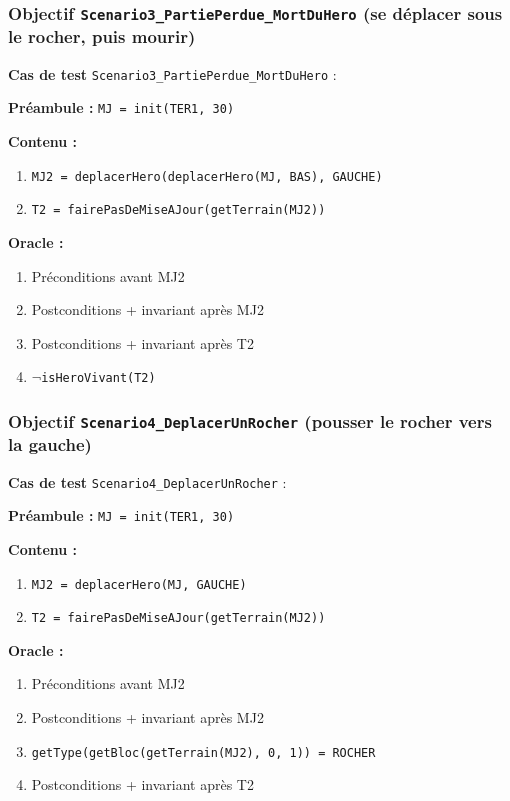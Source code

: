 \documentclass{article}
\newcommand{\cmd}[1]{\texttt{#1}}
\newcommand{\lNOT}{$\lnot$}
\newcommand{\obj}[2]{\subsubsection*{\large{\textbf{Objectif {\cmd{#1} (#2)}}}}}
\newenvironment{cas}[1]
{
	\hspace{1em}\textbf{Cas de test} \cmd{#1} :
	\begin{list}{}{}
}{
	\end{list}\vspace{1em}
}
\newcommand{\pre}[1]{\item \textbf{Préambule :} \cmd{#1}}
\newcommand{\oram}{\item \textbf{Oracle :}}
\newcommand{\opem}{\item \textbf{Contenu :}}
\begin{document}
\obj{Scenario3\_PartiePerdue\_MortDuHero} {se déplacer sous le rocher, puis mourir}
	\begin{cas} {Scenario3\_PartiePerdue\_MortDuHero}
		\pre{MJ = init(TER1, 30)}
		\opem{}
		\begin{enumerate}
			\item \cmd{MJ2 = deplacerHero(deplacerHero(MJ, BAS), GAUCHE)}
			\item \cmd{T2 = fairePasDeMiseAJour(getTerrain(MJ2))}
		\end{enumerate}
		\oram{}
		\begin{enumerate}
			\item Préconditions avant MJ2
			\item Postconditions + invariant après MJ2
			\item Postconditions + invariant après T2
			\item \cmd{\lNOT{}isHeroVivant(T2)}
		\end{enumerate}
	\end{cas}

\obj{Scenario4\_DeplacerUnRocher} {pousser le rocher vers la gauche}
	\begin{cas} {Scenario4\_DeplacerUnRocher}
		\pre{MJ = init(TER1, 30)}
		\opem{}
		\begin{enumerate}
			\item \cmd{MJ2 = deplacerHero(MJ, GAUCHE)}
			\item \cmd{T2 = fairePasDeMiseAJour(getTerrain(MJ2))}
		\end{enumerate}
		\oram{}
		\begin{enumerate}
			\item Préconditions avant MJ2
			\item Postconditions + invariant après MJ2
			\item \cmd{getType(getBloc(getTerrain(MJ2), 0, 1)) = ROCHER}
			\item Postconditions + invariant après T2
		\end{enumerate}
	\end{cas}
\end{document}
